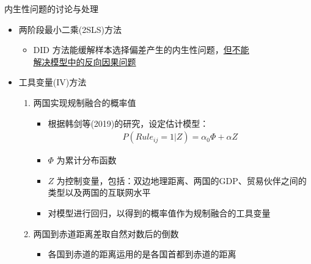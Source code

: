 \documentclass{beamer}
\begin{document}
\begin{frame}{内生性问题的讨论与处理}
    \begin{itemize}
        \item 两阶段最小二乘(2SLS)方法
        \begin{itemize}
            \item DID 方法能缓解样本选择偏差产生的内生性问题，\uline{但不能 \\ 解决模型中的反向因果问题}
        \end{itemize}
        \item 工具变量(IV)方法
        \begin{enumerate}
            \item 两国实现规制融合的概率值
            \begin{itemize}
                \item 根据韩剑等(2019)的研究，设定估计模型：
                \begin{gather*}
                    P(Rule_{ij} = 1 \vert Z)=\alpha_0 \varPhi+\alpha Z
                \end{gather*}
                \item $\varPhi$ 为累计分布函数
                \item $Z$ 为控制变量，包括：双边地理距离、两国的GDP、贸易伙伴之间的类型以及两国的互联网水平
                \item 对模型进行回归，以得到的概率值作为规制融合的工具变量
            \end{itemize}
            \item 两国到赤道距离差取自然对数后的倒数
            \begin{itemize}
                \item 各国到赤道的距离运用的是各国首都到赤道的距离
            \end{itemize}
        \end{enumerate}
    \end{itemize}
\end{frame}
\end{document}
